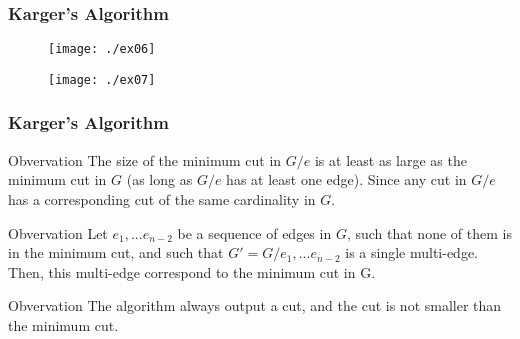 \documentclass[compress,blue]{beamer}
\begin{document}
	\begin{frame}[c]
	\frametitle{Karger's Algorithm}
	\pause
	\vspace{2em}
	\begin{figure}[h]
	\centering
	\texttt{[image: ./ex06]}
	\label{fig:ex06}
	\end{figure}
	
	\begin{figure}[h]
	\centering
	\texttt{[image: ./ex07]}
	\label{fig:ex07}
	\end{figure}
	\end{frame}
	
	\begin{frame}[c]
	\frametitle{Karger's Algorithm}
	\begin{block}{Obvervation}
	The size of the minimum cut in $ G/e $ is at least as large as the minimum cut in $ G $ (as long as $ G/e $ has at least one edge). Since any cut in $ G/e $ has a corresponding cut of the same cardinality in $ G $.
	\end{block}
	\pause
	\begin{block}{Obvervation}
	Let $ e_1,...e_{n-2} $ be a sequence of edges in $ G $, such that none of them is in the minimum cut, and such that $ G'=G/{ e_1,...e_{n-2}} $ is a single multi-edge. Then, this multi-edge correspond to the minimum cut in G.
	\end{block}
	\pause
	\begin{block}{Obvervation}
	The algorithm always output a cut, and the cut is not smaller than the minimum cut.
	\end{block}
	\end{frame}
\end{document}
